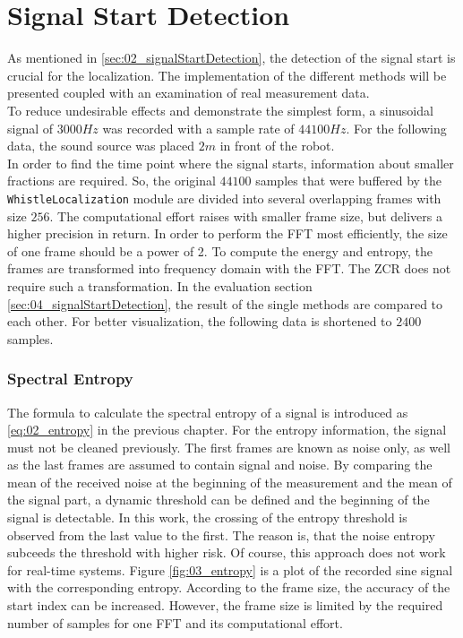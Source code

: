 \section{Signal Start Detection}
\label{sec:03_signalStartDetection}

As mentioned in \cref{sec:02_signalStartDetection}, the detection of the
signal start is crucial for the localization.
The implementation of the different methods will be presented coupled with
an examination of real measurement data.
\\
To reduce undesirable effects and demonstrate the simplest form, a sinusoidal
signal of $3000\si{Hz}$ was recorded with a sample rate of $44100\si{Hz}$.
For the following data, the sound source was placed $2\si{m}$ in front of the robot.
\\
In order to find the time point where the signal starts, information about
smaller fractions are required.
So, the original $44100$ samples that were buffered by the
\lstinline!WhistleLocalization! module are divided into several overlapping
frames with size $256$. The computational effort raises with smaller frame size,
but delivers a higher precision in return.
In order to perform the \ac{FFT} most efficiently, the size of one frame
should be a power of 2.
To compute the energy and entropy, the frames are transformed into
frequency domain with the \ac{FFT}.
The \ac{ZCR} does not require such a transformation.
In the evaluation section \cref{sec:04_signalStartDetection}, the result of the single
methods are compared to each other.
For better visualization, the following data is shortened to $2400$ samples.


\subsubsection*{Spectral Entropy}

The formula to calculate the spectral entropy of a signal is introduced as \cref{eq:02_entropy}
in the previous chapter.
For the entropy information, the signal must not be cleaned previously.
The first frames are known as noise only, as well as the last frames are assumed
to contain signal and noise.
By comparing the mean of the received noise at the beginning of the measurement and
the mean of the signal part, a dynamic threshold can be defined and the beginning of the
signal is detectable.
In this work, the crossing of the entropy threshold is observed from the last
value to the first. The reason is, that the noise entropy subceeds the threshold with higher risk.
Of course, this approach does not work for real-time systems.
Figure \cref{fig:03_entropy} is a plot of the recorded sine signal with the corresponding
entropy.
According to the frame size, the accuracy of the start index can be increased.
However, the frame size is limited by the required number of samples for one \ac{FFT} and
its computational effort.


